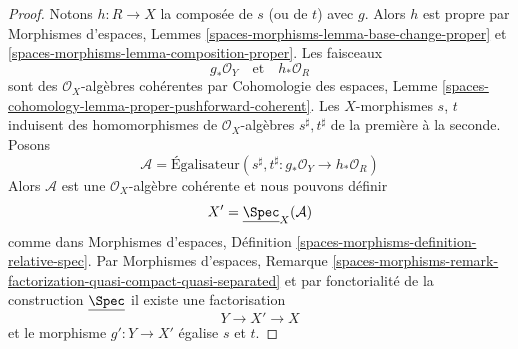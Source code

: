 \begin{proof}
Notons $h : R \to X$ la composée de $s$ (ou de $t$)
avec $g$. Alors $h$ est propre par Morphismes d'espaces, Lemmes
\ref{spaces-morphisms-lemma-base-change-proper} et
\ref{spaces-morphisms-lemma-composition-proper}.
Les faisceaux
$$
g_*\mathcal{O}_Y
\quad\text{et}\quad
h_*\mathcal{O}_R
$$
sont des $\mathcal{O}_X$-algèbres cohérentes par Cohomologie des espaces, Lemme
\ref{spaces-cohomology-lemma-proper-pushforward-coherent}.
Les $X$-morphismes $s$, $t$ induisent des homomorphismes de $\mathcal{O}_X$-algèbres
$s^\sharp, t^\sharp$ de la première à la seconde.
Posons
$$
\mathcal{A} = \text{Égalisateur}\left(s^\sharp, t^\sharp :
g_*\mathcal{O}_Y \longrightarrow h_*\mathcal{O}_R\right)
$$
Alors $\mathcal{A}$ est une $\mathcal{O}_X$-algèbre cohérente et nous pouvons
définir
$$
X' = \underline{\Spec}_X(\mathcal{A})
$$
comme dans Morphismes d'espaces, Définition
\ref{spaces-morphisms-definition-relative-spec}.
Par Morphismes d'espaces, Remarque
\ref{spaces-morphisms-remark-factorization-quasi-compact-quasi-separated}
et par fonctorialité de la construction $\underline{\Spec}$
il existe une factorisation
$$
Y \longrightarrow X' \longrightarrow X
$$
et le morphisme $g' : Y \to X'$ égalise $s$ et $t$.


\end{proof}
